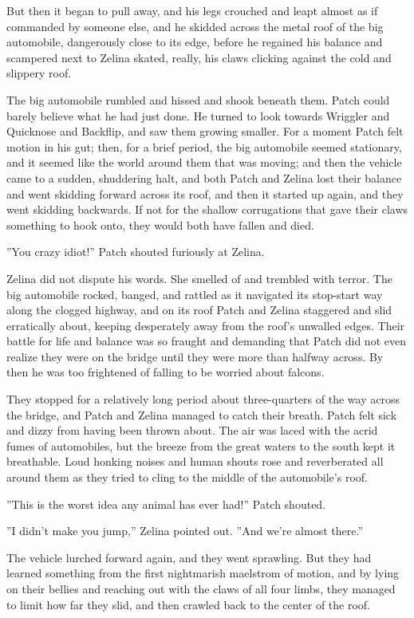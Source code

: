 \documentclass[11pt]{article}
\begin{document}
But then it began to pull away, and his legs crouched and leapt almost as if commanded by someone else, and he skidded across the metal roof of the big automobile, dangerously close to its edge, before he regained his balance and scampered next to Zelina %
 skated, really, his claws clicking against the cold and slippery roof.\par
The big automobile rumbled and hissed and shook beneath them. Patch could barely believe what he had just done. He turned to look towards Wriggler and Quicknose and Backflip, and saw them growing smaller. For a moment Patch felt motion in his gut; then, for a brief period, the big automobile seemed stationary, and it seemed like the world around them that was moving; and then the vehicle came to a sudden, shuddering halt, and both Patch and Zelina lost their balance and went skidding forward across its roof, and then it started up again, and they went skidding backwards. If not for the shallow corrugations that gave their claws something to hook onto, they would both have fallen and died.\par
''You crazy idiot!'' Patch shouted furiously at Zelina.\par
Zelina did not dispute his words. She smelled of and trembled with terror. The big automobile rocked, banged, and rattled as it navigated its stop-start way along the clogged highway, and on its roof Patch and Zelina staggered and slid erratically about, keeping desperately away from the roof's unwalled edges. Their battle for life and balance was so fraught and demanding that Patch did not even realize they were on the bridge until they were more than halfway across. By then he was too frightened of falling to be worried about falcons.\par
They stopped for a relatively long period about three-quarters of the way across the bridge, and Patch and Zelina managed to catch their breath. Patch felt sick and dizzy from having been thrown about. The air was laced with the acrid fumes of automobiles, but the breeze from the great waters to the south kept it breathable. Loud honking noises and human shouts rose and reverberated all around them as they tried to cling to the middle of the automobile's roof.\par
''This is the worst idea any animal has ever had!'' Patch shouted.\par
''I didn't make you jump,'' Zelina pointed out. ''And we're almost there.''\par
The vehicle lurched forward again, and they went sprawling. But they had learned something from the first nightmarish maelstrom of motion, and by lying on their bellies and reaching out with the claws of all four limbs, they managed to limit how far they slid, and then crawled back to the center of the roof.\par
\end{document}
